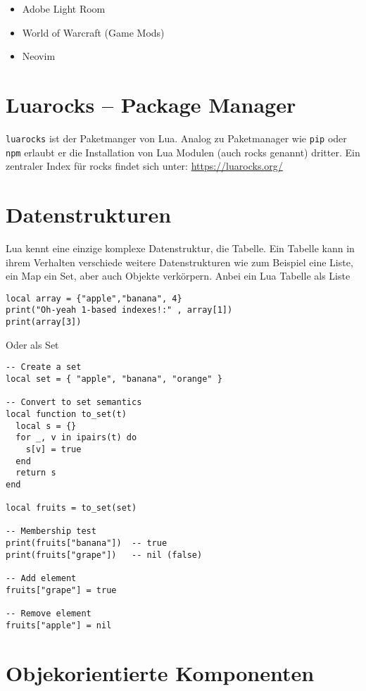 \documentclass[11pt,a4paper]{article}
\begin{document}
\begin{itemize}
    \item Adobe Light Room
    \item World of Warcraft (Game Mods)
    \item Neovim
\end{itemize}

\section*{Luarocks – Package Manager}

\texttt{luarocks} ist der Paketmanger von Lua. Analog zu Paketmanager wie \texttt{pip} oder \texttt{npm} erlaubt er die Installation von Lua Modulen (auch rocks genannt) dritter. Ein zentraler Index für rocks findet sich unter: \url{https://luarocks.org/}

\section*{Datenstrukturen}

Lua kennt eine einzige komplexe Datenstruktur, die Tabelle. Ein Tabelle kann in ihrem Verhalten verschiede weitere Datenstrukturen wie zum Beispiel eine Liste, ein Map ein Set, aber auch Objekte verkörpern. Anbei ein Lua Tabelle als Liste

\begin{lstlisting}
local array = {"apple","banana", 4}
print("Oh-yeah 1-based indexes!:" , array[1])
print(array[3])
\end{lstlisting}

Oder als Set

\begin{lstlisting}
-- Create a set
local set = { "apple", "banana", "orange" }

-- Convert to set semantics
local function to_set(t)
  local s = {}
  for _, v in ipairs(t) do
    s[v] = true
  end
  return s
end

local fruits = to_set(set)

-- Membership test
print(fruits["banana"])  -- true
print(fruits["grape"])   -- nil (false)

-- Add element
fruits["grape"] = true

-- Remove element
fruits["apple"] = nil
\end{lstlisting}

\section*{Objekorientierte Komponenten}
\end{document}
